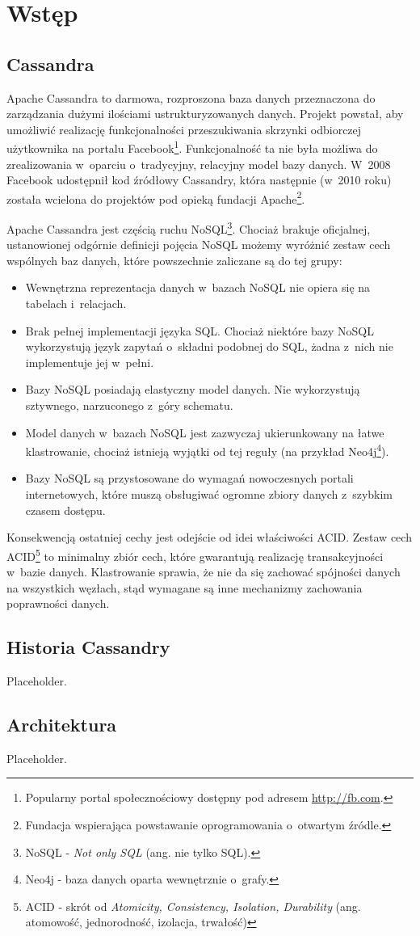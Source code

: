 \chapter{Wstęp}

\section{Cassandra}

Apache Cassandra to darmowa, rozproszona baza danych przeznaczona do zarządzania dużymi ilościami ustrukturyzowanych danych. Projekt powstał, aby umożliwić realizację funkcjonalności przeszukiwania skrzynki odbiorczej użytkownika na portalu Facebook\footnote{Popularny portal społecznościowy dostępny pod adresem \url{http://fb.com}.}. Funkcjonalność ta nie była możliwa do zrealizowania w~oparciu o~tradycyjny, relacyjny model bazy danych. W~2008 Facebook udostępnił kod źródłowy Cassandry, która następnie (w~2010 roku) została wcielona do projektów pod opieką fundacji Apache\footnote{Fundacja wspierająca powstawanie oprogramowania o~otwartym źródle.}.\cite{casshistory} 

Apache Cassandra jest częścią ruchu NoSQL\footnote{NoSQL - \emph{Not only SQL} (ang. nie tylko SQL).}. Chociaż brakuje oficjalnej, ustanowionej odgórnie definicji pojęcia NoSQL możemy wyróżnić zestaw cech wspólnych baz danych, które powszechnie zaliczane są do tej grupy:

\begin{itemize}
	\item Wewnętrzna reprezentacja danych w~bazach NoSQL nie opiera się na tabelach i~relacjach.
	\item Brak pełnej implementacji języka SQL. Chociaż niektóre bazy NoSQL wykorzystują język zapytań o~składni podobnej do SQL, żadna z~nich nie implementuje jej w~pełni.
	\item Bazy NoSQL posiadają elastyczny model danych. Nie wykorzystują sztywnego, narzuconego z~góry schematu.
	\item Model danych w~bazach NoSQL jest zazwyczaj ukierunkowany na łatwe klastrowanie, chociaż istnieją wyjątki od tej reguły (na przykład Neo4j\footnote{Neo4j - baza danych oparta wewnętrznie o~grafy.}).
	\item Bazy NoSQL są przystosowane do wymagań nowoczesnych portali internetowych, które muszą obsługiwać ogromne zbiory danych z~szybkim czasem dostępu. \cite{nosqldistilled}
\end{itemize}

Konsekwencją ostatniej cechy jest odejście od idei właściwości ACID. Zestaw cech ACID\footnote{ACID - skrót od \emph{Atomicity, Consistency, Isolation, Durability} (ang. atomowość, jednorodność, izolacja, trwałość)} to minimalny zbiór cech, które gwarantują realizację transakcyjności w~bazie danych. \cite{transactionconcept} Klastrowanie sprawia, że nie da się zachować spójności danych na wszystkich węzłach, stąd wymagane są inne mechanizmy zachowania poprawności danych.

\section{Historia Cassandry}

Placeholder.

\section{Architektura}

Placeholder.
